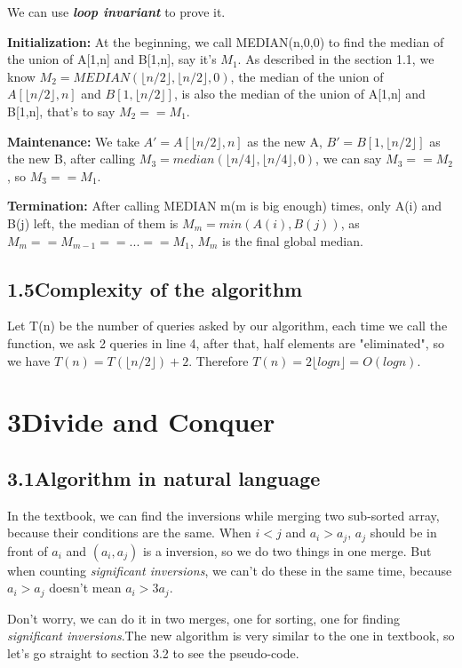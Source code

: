\documentclass[a4paper,12pt]{article}
\begin{document}
We can use \textbf{\textit{loop invariant}} to prove it.

\textbf{Initialization:} At the beginning, we call MEDIAN(n,0,0) to find the median of the union of A[1,n] and B[1,n], say it's $M_1$. As described in the section 1.1, we know $M_2=MEDIAN(\lfloor n/2 \rfloor,\lfloor n/2 \rfloor,0)$, the median of the union of $A[\lfloor n/2 \rfloor,n]$ and $B[1,\lfloor n/2 \rfloor]$, is also the median of the union of A[1,n] and B[1,n], that's to say $M_2==M_1$.

\textbf{Maintenance:} We take $A'=A[\lfloor n/2 \rfloor,n]$ as the new A, $B'=B[1,\lfloor n/2 \rfloor]$ as the new B, after calling $M_3=median(\lfloor n/4 \rfloor,\lfloor n/4 \rfloor,0)$, we can say $M_3==M_2$, so $M_3==M_1$.

\textbf{Termination:} After calling MEDIAN m(m is big enough) times, only A(i) and B(j) left, the median of them is $M_m=min(A(i),B(j))$, as $M_m==M_{m-1}==...==M_1$, $M_m$ is the final global median.


\subsection*{\textnormal{1.5\quad Complexity of the algorithm}}

Let T(n) be the number of queries asked by our algorithm, each time we call the function, we ask 2 queries in line 4, after that, half elements are "eliminated", so we have $T(n)=T(\lfloor n/2 \rfloor) + 2$. Therefore $T(n)=2\lfloor logn \rfloor=O(logn)$.

\section*{3\quad Divide and Conquer}
\subsection*{\textnormal{3.1\quad Algorithm in natural language}}

In the textbook, we can find the inversions while merging two sub-sorted array, because their conditions are the same. When $i<j$ and $a_i>a_j$,  $a_j$ should be in front of $a_i$ and $(a_i,a_j)$ is a inversion, so we do two things in one merge. But when counting \textit{significant inversions}, we can't do these in the same time, because $a_i>a_j$ doesn't mean $a_i>3a_j$.

Don't worry, we can do it in two merges, one for sorting, one for finding
\textit{significant inversions}.The new algorithm is very similar to the one in textbook, so let's go straight to section 3.2 to see the pseudo-code.
\end{document}
